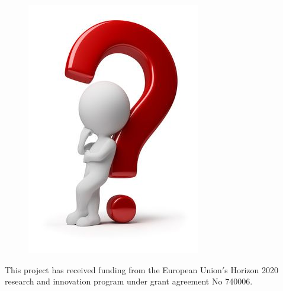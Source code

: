 \documentclass[aspectratio=43]{beamer}
\begin{document}
\begin{frame}


	\begin{figure}
		\includegraphics[width = 4 cm]{plots/final/thinking.png}
	\end{figure}		

	{\small \color{blue} This project has received funding from the European Union$'$s Horizon 2020 research and innovation program under grant agreement No 740006.}

\end{frame}
\end{document}
